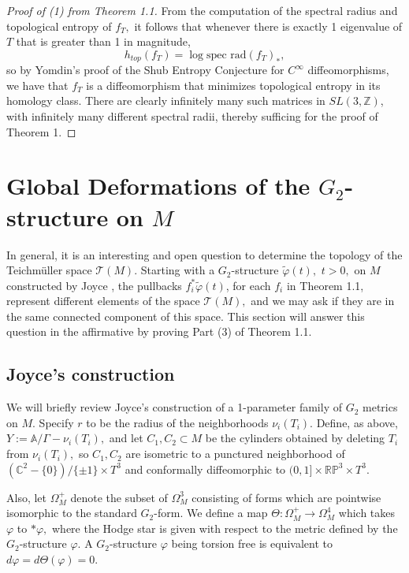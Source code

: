 \documentclass{amsart}
\theoremstyle{theorem}
\theoremstyle{definition}
\theoremstyle{definition}
\theoremstyle{definition}
\theoremstyle{theorem}
\theoremstyle{theorem}
\theoremstyle{theorem}
\theoremstyle{corollary}
\theoremstyle{question}
\theoremstyle{remark}
\begin{document}
\begin{proof}[Proof of (1) from Theorem 1.1]
From the computation of the spectral radius and topological entropy of $f_T,$ it follows that whenever there is exactly 1 eigenvalue of $T$ that is greater than 1 in magnitude, $$h_{top}(f_T) = \log\text{spec~rad}(f_T)_*,$$ so by Yomdin's proof of the Shub Entropy Conjecture for $C^\infty$ diffeomorphisms, we have that $f_T$ is a diffeomorphism that minimizes topological entropy in its homology class. There are clearly infinitely many such matrices in $SL(3, \mathbb{Z})$, with infinitely many different spectral radii, thereby sufficing for the proof of Theorem 1.
\end{proof} 

\section{Global Deformations of the $G_2$-structure on $M$}

In general, it is an interesting and open question to determine the topology of the Teichm\"uller space $\mathcal{T}(M)$. Starting with a $G_2$-structure $\widetilde\varphi(t),$ $t>0,$ on $M$ constructed by Joyce \cite[Example 7]{Joyce2}, the pullbacks $f_i^*\widetilde\varphi(t)$, for each $f_i$ in Theorem 1.1, represent different elements of the space $\mathcal{T}(M),$ and we may ask if they are in the same connected component of this space. This section will answer this question in the affirmative by proving Part (3) of Theorem 1.1.

\subsection{Joyce's construction}
We will briefly review Joyce's construction of a 1-parameter family of $G_2$ metrics on $M$. Specify $r$ to be the radius of the neighborhoods $\nu_i(T_i).$ Define, as above, $Y := \mathbb{A}/\Gamma - \nu_i(T_i),$ and let $C_1, C_2\subset M$ be the cylinders obtained by deleting $T_i$ from $\nu_i(T_i),$ so $C_1, C_2$ are isometric to a punctured neighborhood of $(\mathbb{C}^2 - \{0\})/\{\pm 1\}\times T^3$ and conformally diffeomorphic to $(0, 1]\times \mathbb{RP}^3\times T^3.$

Also, let $\Omega^+_M$ denote the subset of $\Omega^3_M$ consisting of forms which are pointwise isomorphic to the standard $G_2$-form. We define a map $\Theta:\Omega^+_M\to \Omega^4_M$ which takes $\varphi$ to $*\varphi,$ where the Hodge star is given with respect to the metric defined by the $G_2$-structure $\varphi.$ A $G_2$-structure $\varphi$ being torsion free is equivalent to $d\varphi = d\Theta(\varphi)=0.$
\end{document}
